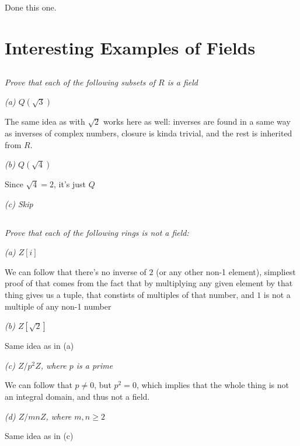 \documentclass[11pt,oneside,titlepage]{book}
\begin{document}
\subsection{}

Done this one.

\section{Interesting Examples of Fields}

\subsection{}

\textit{Prove that each of the following subsets of $R$ is a field}

\textit{(a) $Q(\sqrt{3})$}

The same idea as with $\sqrt{2}$ works here as well: inverses are
found in a same way as inverses of complex numbers, closure is kinda
trivial, and the rest is inherited from $R$. 

\textit{(b) $Q(\sqrt{4})$}

Since $\sqrt{4} = 2$, it's just $Q$

\textit{(c) Skip}

\subsection{}

\textit{Prove that each of the following rings is not a field:}

\textit{(a) $Z[i]$}

We can follow that there's no inverse of $2$ (or any other non-1
element), simpliest proof of that comes from the fact that by
multiplying any given element by that thing gives us a tuple,
that constists of multiples of that number, and $1$ is not a multiple
of any non-1 number

\textit{(b) $Z[\sqrt{2}]$}

Same idea as in (a)

\textit{(c) $Z/p^2Z$, where $p$ is a prime}

We can follow that $p \neq 0$, but $p^2 = 0$, which implies that
the whole thing is not an integral domain, and thus not a field.

\textit{(d) $Z/mnZ$, where $m, n \geq 2$}

Same idea as in (c)

\subsection{}
\end{document}
